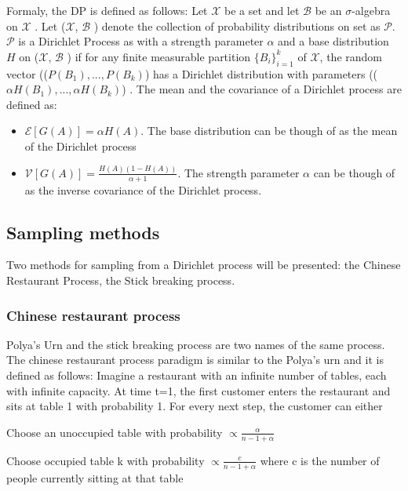 \documentclass[twoside,hidelinks]{article}
\begin{document}
Formaly, the DP is defined as follows: Let $\mathcal{X}$ be a set and let $\mathcal{B}$ be an $\sigma$-algebra on $\mathcal{X}$ .  Let ($\mathcal{X} $, $\mathcal{B}$ )  denote the collection of probability distributions on set as $\mathcal{P} $. $\mathcal{P}$ is a Dirichlet Process as with a strength parameter $\alpha$ and a base distribution $H$ on ($\mathcal{X} $, $\mathcal{B} $ ) if for any finite measurable partition $ \{B_i\}_{i=1}^k$ of $\mathcal{X} $, the random vector (($ P(B_1), ..., P(B_k)$) has a Dirichlet distribution with parameters (($ \alpha H(B_1), ..., \alpha H(B_k)$) . The mean and the covariance of a Dirichlet process are defined as:
\begin{itemize}

	\item{ $ \mathcal{E}[G(A)] = \alpha H(A) $. The base distribution can be though of as the mean of the Dirichlet process}

	\item{$ \mathcal{V}[G(A)] = \frac{H(A)(1-H(A))}{\alpha + 1} $. The strength parameter $\alpha$ can be though of as the inverse covariance of the Dirichlet process. }
\end{itemize}

\subsection{Sampling methods}

Two methods for sampling from a Dirichlet process will be presented: the Chinese Restaurant Process, the Stick breaking process.


\subsubsection{Chinese restaurant process}
\label{sec:crp}
Polya's Urn and the stick breaking process are two names of the same process. The chinese restaurant process paradigm is similar to the Polya's urn and it is defined as follows:
Imagine a restaurant with an infinite number of tables, each with infinite capacity. At time t=1, the first customer enters the restaurant and sits at table 1 with probability 1. For every next step, the customer can either

\begin{compactitem}
	\item Choose an unoccupied table with probability $ \propto \frac{\alpha}{n-1+ \alpha }$
	\item Choose occupied table k with probability $ \propto  \frac{c}{n-1+ \alpha }$ where c is the number of people currently sitting at that table
\end{compactitem}
\end{document}
